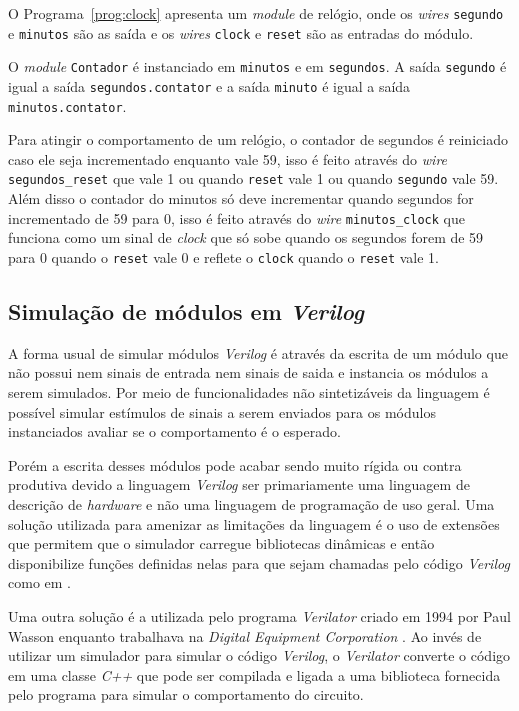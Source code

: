O Programa~\ref{prog:clock} apresenta um \emph{module} de relógio,
onde os \emph{wires} \texttt{segundo} e \texttt{minutos} são as 
saída e os \emph{wires} \texttt{clock} e \texttt{reset} são as entradas 
do módulo.

O \emph{module} \texttt{Contador} é instanciado em \texttt{minutos}
e em \texttt{segundos}. A saída \texttt{segundo} é igual a saída 
\texttt{segundos.contator} e a saída \texttt{minuto} é igual a saída 
\texttt{minutos.contator}.

Para atingir o comportamento de um relógio, o contador de segundos é
reiniciado caso ele seja incrementado enquanto vale 59, isso é feito
através do \emph{wire} \texttt{segundos\_reset} que vale 1 ou quando
\texttt{reset} vale 1 ou quando \texttt{segundo} vale 59.
Além disso o contador do minutos só deve incrementar quando segundos
for incrementado de 59 para 0, isso é feito através do \emph{wire}
\texttt{minutos\_clock} que funciona como um sinal de \emph{clock} que só
sobe quando os segundos forem de 59 para 0 quando o \texttt{reset} vale 0
e reflete o \texttt{clock} quando o \texttt{reset} vale 1.

\subsection{Simulação de módulos em \emph{Verilog}}
\label{sec:vesim}

A forma usual de simular módulos \emph{Verilog} é através
da escrita de um módulo que não possui nem sinais de entrada
nem sinais de saida e instancia os módulos a serem simulados. Por meio
de funcionalidades não sintetizáveis da linguagem é possível
simular estímulos de sinais a serem enviados para os módulos 
instanciados avaliar se o comportamento é o esperado.

Porém a escrita desses módulos pode acabar sendo muito 
rígida ou contra produtiva devido a linguagem \emph{Verilog} ser primariamente
uma linguagem de descrição de \emph{hardware} e não uma linguagem de
programação de uso geral. Uma solução utilizada para amenizar as 
limitações da linguagem é o uso de extensões que permitem que o simulador 
carregue bibliotecas dinâmicas e então disponibilize funções 
definidas nelas para que sejam chamadas
pelo código \emph{Verilog} como em \cite{VPI}.

Uma outra solução é a utilizada pelo programa \emph{Verilator} criado
em 1994 por Paul Wasson enquanto trabalhava na \emph{Digital Equipment Corporation}
\citep{Veri}. Ao invés de utilizar um simulador para simular o código \emph{Verilog},
o \emph{Verilator} converte o código em uma classe \emph{C++} que pode ser compilada e 
ligada a uma biblioteca fornecida pelo programa para simular o comportamento do circuito.

